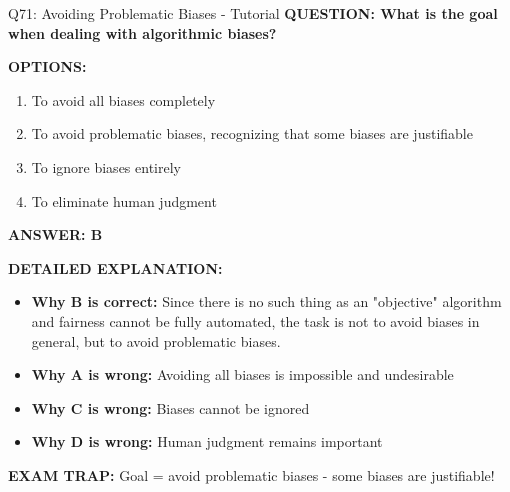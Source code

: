 \documentclass[8pt]{beamer}
\begin{document}
	\begin{frame}{Q71: Avoiding Problematic Biases - Tutorial}
		\fontsize{6.5}{7.5}\selectfont
		\textbf{QUESTION: What is the goal when dealing with algorithmic biases?}
		
		\vspace{0.1cm}
		\textbf{OPTIONS:}
		\begin{enumerate}
			\item To avoid all biases completely
			\item To avoid problematic biases, recognizing that some biases are justifiable
			\item To ignore biases entirely
			\item To eliminate human judgment
		\end{enumerate}
		
		\vspace{0.1cm}
		\textcolor{myblue}{\textbf{ANSWER: B}}
		
		\vspace{0.1cm}
		\textbf{DETAILED EXPLANATION:}
		\begin{itemize}
			\item \textbf{Why B is correct:} Since there is no such thing as an "objective" algorithm and fairness cannot be fully automated, the task is not to avoid biases in general, but to avoid problematic biases.
			\item \textbf{Why A is wrong:} Avoiding all biases is impossible and undesirable
			\item \textbf{Why C is wrong:} Biases cannot be ignored
			\item \textbf{Why D is wrong:} Human judgment remains important
		\end{itemize}
		
		\textcolor{myred}{\textbf{EXAM TRAP:}} Goal = \textcolor{myblue}{avoid problematic biases} - some biases are justifiable!
	\end{frame}
	
\end{document}
